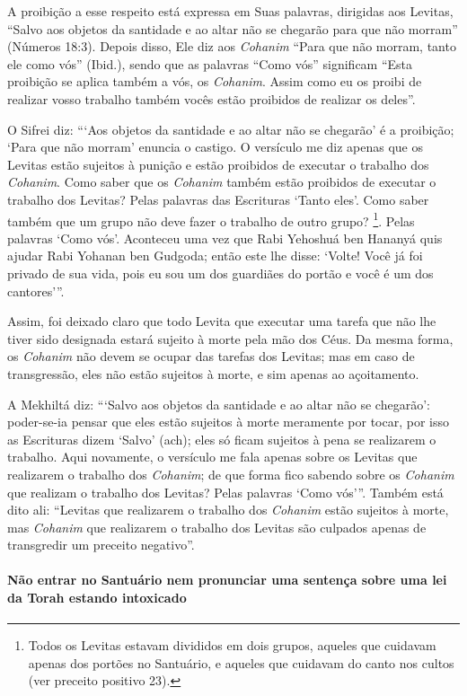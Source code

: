 A proibição a esse respeito está expressa em Suas palavras, dirigidas
aos Levitas, ``Salvo aos objetos da santidade e ao altar não se chegarão
para que não morram'' (Números 18:3). Depois disso, Ele diz aos
\textit{Cohanim} ``Para que não morram, tanto ele como vós'' (Ibid.), sendo
que as palavras ``Como vós'' significam ``Esta proibição se aplica
também a vós, os \textit{Cohanim}. Assim como eu os proibi de realizar vosso
trabalho também vocês estão proibidos de realizar os deles''.

O Sifrei diz: ```Aos objetos da santidade e ao altar não se chegarão' é
a proibição; `Para que não morram' enuncia o castigo. O versículo me diz
apenas que os Levitas estão sujeitos à punição e estão proibidos de
executar o trabalho dos \textit{Cohanim}. Como saber que os \textit{Cohanim} também
estão proibidos de executar o trabalho dos Levitas? Pelas palavras das
Escrituras `Tanto eles'. Como saber também que um grupo não deve fazer o
trabalho de outro grupo? \footnote{Todos os Levitas estavam divididos em dois grupos, aqueles que cuidavam apenas dos portões no Santuário, e aqueles que cuidavam do
canto nos cultos (ver preceito positivo 23).}. Pelas palavras `Como
vós'. Aconteceu uma vez que Rabi Yehoshuá ben Hananyá quis ajudar Rabi
Yohanan ben Gudgoda; então este lhe disse: `Volte! Você já foi privado
de sua vida, pois eu sou um dos guardiães do portão e você é um dos
cantores'''.

Assim, foi deixado claro que todo Levita que executar uma tarefa que não
lhe tiver sido designada estará sujeito à morte pela mão dos Céus. Da
mesma forma, os \textit{Cohanim} não devem se ocupar das tarefas dos Levitas;
mas em caso de transgressão, eles não estão sujeitos à morte, e sim
apenas ao açoitamento.

A Mekhiltá diz: ```Salvo aos objetos da santidade e ao altar não se
chegarão': poder-se-ia pensar que eles estão sujeitos à morte meramente
por tocar, por isso as Escrituras dizem `Salvo' (ach); eles só ficam
sujeitos à pena se realizarem o trabalho. Aqui novamente, o versículo me
fala apenas sobre os Levitas que realizarem o trabalho dos \textit{Cohanim}; de
que forma fico sabendo sobre os \textit{Cohanim} que realizam o trabalho dos Levitas? Pelas palavras `Como
vós'''. Também está dito ali: ``Levitas que realizarem o trabalho dos
\textit{Cohanim} estão sujeitos à morte, mas \textit{Cohanim} que realizarem o
trabalho dos Levitas são culpados apenas de transgredir um preceito
negativo''.

\paragraph{Não entrar no Santuário nem pronunciar uma
sentença sobre uma lei da Torah estando intoxicado}

